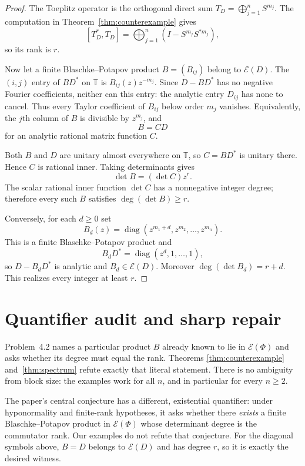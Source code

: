 \documentclass[11pt]{article}
\newcommand{\T}{\mathbb T}
\newcommand{\E}{\mathcal E}
\newcommand{\diag}{\operatorname{diag}}
\begin{document}
\begin{proof}
The Toeplitz operator is the orthogonal direct sum
$T_D=\bigoplus_{j=1}^n S^{m_j}$.  The computation in
Theorem~\ref{thm:counterexample} gives
\[
 [T_D^*,T_D]=\bigoplus_{j=1}^n (I-S^{m_j}S^{*m_j}),
\]
so its rank is $r$.

Now let a finite Blaschke--Potapov product $B=(B_{ij})$ belong to $\E(D)$.
The $(i,j)$ entry of $BD^*$ on $\T$ is $B_{ij}(z)z^{-m_j}$.  Since
$D-BD^*$ has no negative Fourier coefficients, neither can this entry: the
analytic entry $D_{ij}$ has none to cancel.  Thus every Taylor coefficient of
$B_{ij}$ below order $m_j$ vanishes.  Equivalently, the $j$th column of $B$
is divisible by $z^{m_j}$, and
\[
 B=CD
\]
for an analytic rational matrix function $C$.

Both $B$ and $D$ are unitary almost everywhere on $\T$, so
$C=BD^*$ is unitary there.  Hence $C$ is rational inner.  Taking
determinants gives
\[
 \det B=(\det C)z^r.
\]
The scalar rational inner function $\det C$ has a nonnegative integer degree;
therefore every such $B$ satisfies $\deg(\det B)\geq r$.

Conversely, for each $d\geq0$ set
\[
 B_d(z)=\diag(z^{m_1+d},z^{m_2},\ldots,z^{m_n}).
\]
This is a finite Blaschke--Potapov product and
\[
 B_dD^*=\diag(z^d,1,\ldots,1),
\]
so $D-B_dD^*$ is analytic and $B_d\in\E(D)$.  Moreover
$\deg(\det B_d)=r+d$.  This realizes every integer at least $r$.
\end{proof}

\section{Quantifier audit and sharp repair}

Problem~4.2 names a particular product $B$ already known to lie in
$\E(\Phi)$ and asks whether its degree must equal the rank.  Theorems
\ref{thm:counterexample} and~\ref{thm:spectrum} refute exactly that literal
statement.  There is no ambiguity from block size: the examples work for all
$n$, and in particular for every $n\geq2$.

The paper's central conjecture has a different, existential quantifier: under
hyponormality and finite-rank hypotheses, it asks whether there \emph{exists}
a finite Blaschke--Potapov product in $\E(\Phi)$ whose determinant degree is
the commutator rank.  Our examples do not refute that conjecture.  For the
diagonal symbols above, $B=D$ belongs to $\E(D)$ and has degree $r$, so it is
exactly the desired witness.
\end{document}
